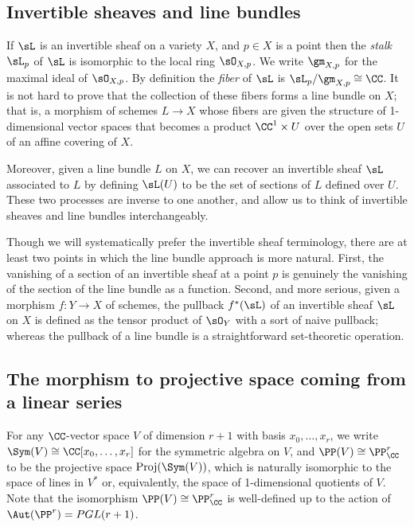 \subsection{Invertible sheaves and line bundles}

If $\sL$ is an invertible sheaf on a variety $X$, and $p\in X$ is a point then the \emph{stalk} $\sL_p$ of $\sL$ is isomorphic to the local
ring $\sO_{X,p}$. We write $\gm_{X,p}$ for the maximal ideal of $\sO_{X,p}$. By definition the \emph{fiber} of $\sL$ is 
$\sL_p/\gm_{X,p}\cong \CC$. It is not hard to prove that the collection of these fibers forms a line bundle on $X$; that is,
a morphism of schemes $L \to X$ whose fibers are given the structure of 1-dimensional vector spaces that becomes
a product $\CC^1 \times U$ over the open sets $U$ of an affine covering of $X$.

Moreover,
given a line bundle $L$ on $X$, we can recover an invertible sheaf $\sL$ associated to $L$ by defining
$\sL(U)$ to be the set of sections of $L$ defined over $U$. These two processes are inverse to one another, and allow
us to think of invertible sheaves and line bundles interchangeably.

Though we will systematically prefer the invertible sheaf terminology, there are at least two points in which the line bundle approach is more natural. First,  the vanishing of a section of an invertible sheaf at a point $p$ is genuinely the vanishing of the 
section of the line bundle as a function. Second, and more serious, given a morphism $f: Y\to X$ of schemes, the 
pullback $f^*(\sL)$ of an invertible sheaf $\sL$ on $X$ is defined as the tensor product of $\sO_Y$ with a sort of naive pullback; whereas the pullback of a line bundle is a straightforward set-theoretic operation.


\subsection{The morphism to projective space coming from a linear series} \label{morphism from series}
For any $\CC$-vector space $V$ of dimension $r+1$ with basis $x_{0}, \dots, x_{r}$, we write $\Sym(V) \cong \CC[x_{0},\dots, x_{r}]$ for the symmetric algebra on $V$, and
$\PP(V)\cong \PP^{r}_{\CC}$ to be the projective space ${\rm Proj}(\Sym(V))$, which is naturally isomorphic to the
space of lines in $V^{*}$ or, equivalently,  the space of 1-dimensional quotients of $V$. Note that the isomorphism $\PP(V)\cong \PP^{r}_{\CC}$ is well-defined up to the action
of $\Aut(\PP^r) = PGL(r+1)$.

